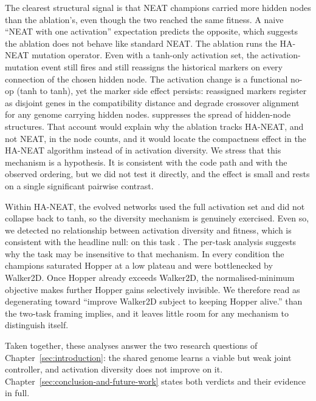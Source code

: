 The clearest structural signal is that NEAT champions carried more hidden nodes than the ablation's, even though the two reached the same fitness.
A naive ``NEAT with one activation'' expectation predicts the opposite, which suggests the ablation does not behave like standard NEAT.
The ablation runs the HA-NEAT mutation operator.
Even with a tanh-only activation set, the activation-mutation event still fires and still reassigns the historical markers on every connection of the chosen hidden node.
The activation change is a functional no-op (tanh to tanh), yet the marker side effect persists: reassigned markers register as disjoint genes in the compatibility distance and degrade crossover alignment for any genome carrying hidden nodes.
 suppresses the spread of hidden-node structures.
That account would explain why the ablation tracks HA-NEAT, and not NEAT, in the node counts, and it would locate the compactness effect in the HA-NEAT algorithm instead of in activation diversity.
We stress that this mechanism is a hypothesis.
It is consistent with the code path and with the observed ordering, but we did not test it directly, and the effect is small and rests on a single significant pairwise contrast.

Within HA-NEAT, the evolved networks used the full activation set and did not collapse back to tanh, so the diversity mechanism is genuinely exercised.
Even so, we detected no relationship between activation diversity and fitness, which is consistent with the headline null: on this task .
The per-task analysis suggests why the task may be insensitive to that mechanism.
In every condition the champions saturated Hopper at a low plateau and were bottlenecked by Walker2D.
Once Hopper already exceeds Walker2D, the normalised-minimum objective makes further Hopper gains selectively invisible.
We therefore read  as degenerating toward ``improve Walker2D subject to keeping Hopper alive.''
 than the two-task framing implies, and it leaves little room for any mechanism to distinguish itself.

Taken together, these analyses answer the two research questions of Chapter~\ref{sec:introduction}: the shared genome learns a viable but weak joint controller, and activation diversity does not improve on it.
Chapter~\ref{sec:conclusion-and-future-work} states both verdicts and their evidence in full.

